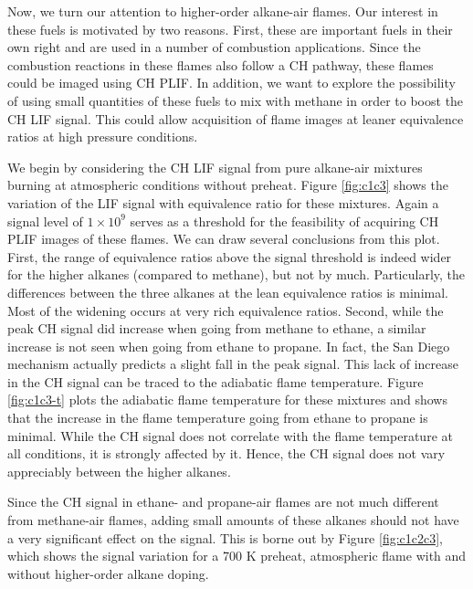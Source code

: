 Now, we turn our attention to higher-order alkane-air flames.
Our interest in these fuels is motivated by two reasons.
First, these are important fuels in their own right and are used in a number of combustion applications.
Since the combustion reactions in these flames also follow a CH pathway, these flames could be imaged using CH PLIF.
In addition, we want to explore the possibility of using small quantities of these fuels to mix with methane in order to boost the CH LIF signal.
This could allow acquisition of flame images at leaner equivalence ratios at high pressure conditions.

We begin by considering the CH LIF signal from pure alkane-air mixtures burning at atmospheric conditions without preheat.
Figure \ref{fig:c1c3} shows the variation of the LIF signal with equivalence ratio for these mixtures.
Again a signal level of \(1\times10^9\) serves as a threshold for the feasibility of acquiring CH PLIF images of these flames.
We can draw several conclusions from this plot.
First, the range of equivalence ratios above the signal threshold is indeed wider for the higher alkanes (compared to methane), but not by much.
Particularly, the differences between the three alkanes at the lean equivalence ratios is minimal.
Most of the widening occurs at very rich equivalence ratios.
Second, while the peak CH signal did increase when going from methane to ethane, a similar increase is not seen when going from ethane to propane.
In fact, the San Diego mechanism actually predicts a slight fall in the peak signal.
This lack of increase in the CH signal can be traced to the adiabatic flame temperature.
Figure \ref{fig:c1c3-t} plots the adiabatic flame temperature for these mixtures and shows that the increase in the flame temperature going from ethane to propane is minimal.
While the CH signal does not correlate with the flame temperature at all conditions, it is strongly affected by it.
Hence, the CH signal does not vary appreciably between the higher alkanes.




Since the CH signal in ethane- and propane-air flames are not much different from methane-air flames, adding small amounts of these alkanes should not have a very significant effect on the signal.
This is borne out by Figure \ref{fig:c1c2c3}, which shows the signal variation for a 700 K preheat, atmospheric flame with and without higher-order alkane doping.



